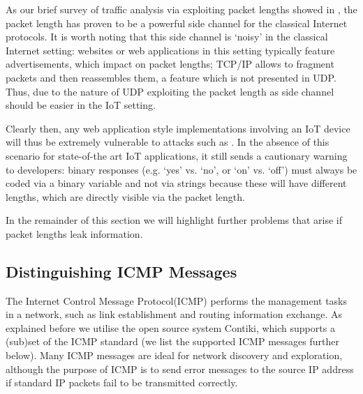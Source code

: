\documentclass{article}
\begin{document}
As our brief survey of traffic analysis via exploiting packet lengths showed in , the packet length has proven to be a powerful side channel for the classical Internet protocols. It is worth noting that this side channel is `noisy' in the classical Internet setting: websites or web applications in this setting typically feature advertisements, which impact on packet lengths; TCP/IP allows to fragment packets and then reassembles them, a feature which is not presented in UDP. Thus, due to the nature of UDP exploiting the packet length as side channel should be easier in the IoT setting.

Clearly then, any web application style implementations involving an IoT device will thus be extremely vulnerable to attacks such as \cite{WebSidechannel}. In the absence of this scenario for state-of-the art IoT applications, it still sends a cautionary warning to developers: binary responses (e.g. `yes' vs. `no', or `on' vs. `off') must always be coded via a binary variable and not via strings because these will have different lengths, which are directly visible via the packet length.

In the remainder of this section we will highlight further problems that arise if packet lengths leak information.

\subsection{Distinguishing ICMP Messages}
The Internet Control Message Protocol(ICMP)\cite{rfc4443} performs the management tasks in a network, such as link establishment and routing information exchange. As explained before we utilise the open source system Contiki, which supports a (sub)set of the ICMP standard (we list the supported ICMP messages further below). Many ICMP messages are ideal for network discovery and exploration, although the purpose of ICMP is to send error messages to the source IP address if standard IP packets fail to be transmitted correctly. 
\end{document}
